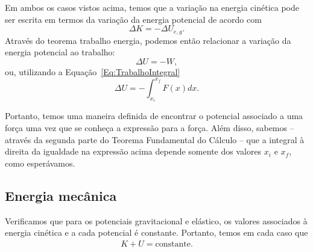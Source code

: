 Em ambos os casos vistos acima, temos que a variação na energia cinética pode ser escrita em termos da variação da energia potencial de acordo com
\begin{equation}
  \Delta K = - \Delta U_{e,g}.
\end{equation}
%
Através do teorema trabalho energia, podemos então relacionar a variação da energia potencial ao trabalho:
\begin{equation}
  \Delta U = - W,
\end{equation}
%
ou, utilizando a Equação~\eqref{Eq:TrabalhoIntegral}
\begin{equation}\label{Eq:CalculoDoPotencial}
  \Delta U = - \int_{x_i}^{x_f} F(x) dx.
\end{equation}

Portanto, temos uma maneira definida de encontrar o potencial associado a uma força uma vez que se conheça a expressão para a força. Além disso, sabemos -- através da segunda parte do Teorema Fundamental do Cálculo -- que a integral à direita da igualdade na expressão acima depende somente dos valores $x_i$ e $x_f$, como esperávamos.

\subsection{Energia mecânica}

Verificamos que para os potenciais gravitacional e elástico, os valores associados à energia cinética e a cada potencial é constante. Portanto, temos em cada caso que
\begin{align}
  K + U = \textrm{constante}.
\end{align}

